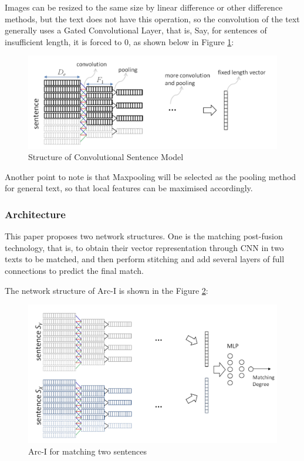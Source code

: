 Images can be resized to the same size by linear difference or other difference methods, but the text does not have this operation, so the convolution of the text generally uses a Gated Convolutional Layer, that is, Say, for sentences of insufficient length, it is forced to 0, as shown below in Figure \ref{fig:cnnamnls1}:

\begin{figure}[h!]
\centering
\includegraphics[width=.8\textwidth]{cnnamnls1.pdf}
\caption{Structure of Convolutional Sentence Model \cite{hu2015convolutional}}
\label{fig:cnnamnls1}
\end{figure}

Another point to note is that Maxpooling will be selected as the pooling method for general text, so that local features can be maximised accordingly.

\subsubsection{Architecture}
This paper proposes two network structures. One is the matching post-fusion technology, that is, to obtain their vector representation through CNN in two texts to be matched, and then perform stitching and add several layers of full connections to predict the final match.

The network structure of Arc-I is shown in the Figure \ref{fig:cnnamnls2}:

\begin{figure}[h!]
\centering
\includegraphics[width=.8\textwidth]{cnnamnls2.pdf}
\caption{Arc-I for matching two sentences \cite{hu2015convolutional}}
\label{fig:cnnamnls2}
\end{figure}

